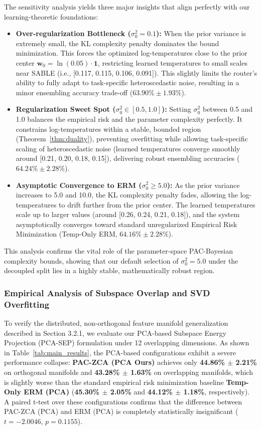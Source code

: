 The sensitivity analysis yields three major insights that align perfectly with our learning-theoretic foundations:
\begin{itemize}
    \item \textbf{Over-regularization Bottleneck ($\sigma_0^2 = 0.1$):} When the prior variance is extremely small, the KL complexity penalty dominates the bound minimization. This forces the optimized log-temperatures close to the prior center $\mathbf{w}_0 = \ln(0.05) \cdot \mathbf{1}$, restricting learned temperatures to small scales near SABLE (i.e., [0.117, 0.115, 0.106, 0.091]). This slightly limits the router's ability to fully adapt to task-specific heteroscedastic noise, resulting in a minor ensembling accuracy trade-off ($63.90\% \pm 1.93\%$).
    \item \textbf{Regularization Sweet Spot ($\sigma_0^2 \in [0.5, 1.0]$):} Setting $\sigma_0^2$ between 0.5 and 1.0 balances the empirical risk and the parameter complexity perfectly. It constrains log-temperatures within a stable, bounded region (Theorem~\ref{thm:duality}), preventing overfitting while allowing task-specific scaling of heteroscedastic noise (learned temperatures converge smoothly around [0.21, 0.20, 0.18, 0.15]), delivering robust ensembling accuracies ($64.24\% \pm 2.28\%$).
    \item \textbf{Asymptotic Convergence to ERM ($\sigma_0^2 \ge 5.0$):} As the prior variance increases to 5.0 and 10.0, the KL complexity penalty fades, allowing the log-temperatures to drift further from the prior center. The learned temperatures scale up to larger values (around [0.26, 0.24, 0.21, 0.18]), and the system asymptotically converges toward standard unregularized Empirical Risk Minimization (Temp-Only ERM, $64.16\% \pm 2.28\%$).
\end{itemize}
This analysis confirms the vital role of the parameter-space PAC-Bayesian complexity bounds, showing that our default selection of $\sigma_0^2 = 5.0$ under the decoupled split lies in a highly stable, mathematically robust region.

\subsubsection{Empirical Analysis of Subspace Overlap and SVD Overfitting}
To verify the distributed, non-orthogonal feature manifold generalization described in Section 3.2.1, we evaluate our PCA-based Subspace Energy Projection (PCA-SEP) formulation under 12 overlapping dimensions. As shown in Table~\ref{tab:main_results}, the PCA-based configurations exhibit a severe performance collapse: \textbf{PAC-ZCA (PCA Ours)} achieves only \textbf{44.86\% $\pm$ 2.21\%} on orthogonal manifolds and \textbf{43.28\% $\pm$ 1.63\%} on overlapping manifolds, which is slightly worse than the standard empirical risk minimization baseline \textbf{Temp-Only ERM (PCA)} (\textbf{45.30\% $\pm$ 2.05\%} and \textbf{44.12\% $\pm$ 1.18\%}, respectively). A paired t-test over these configurations confirms that the difference between PAC-ZCA (PCA) and ERM (PCA) is completely statistically insignificant ($t = -2.0046$, $p = 0.1155$).

